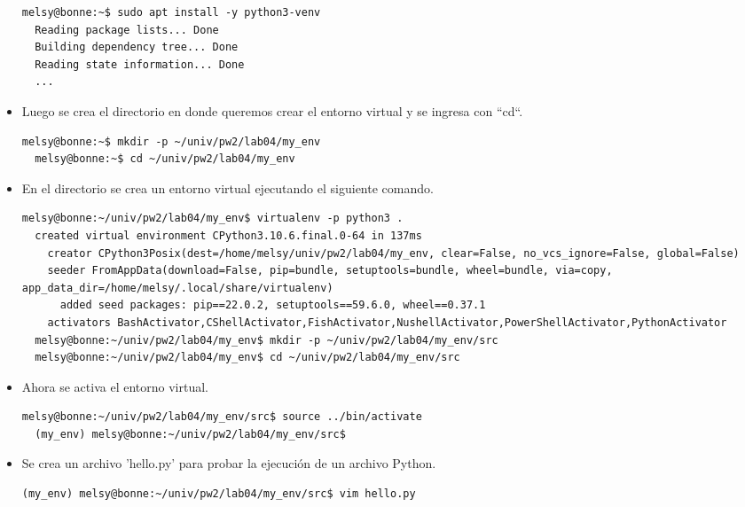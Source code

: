 \documentclass{article}
\begin{document}
\begin{itemize}
  \begin{lstlisting}[style=shell]
  melsy@bonne:~$ sudo apt install -y python3-venv
  Reading package lists... Done
  Building dependency tree... Done
  Reading state information... Done
  ...
  \end{lstlisting}
  
  \item Luego se crea el directorio en donde queremos crear el entorno virtual y se ingresa con ``cd``.

  \begin{lstlisting}[style=shell]
  melsy@bonne:~$ mkdir -p ~/univ/pw2/lab04/my_env
  melsy@bonne:~$ cd ~/univ/pw2/lab04/my_env
  \end{lstlisting}
  
  \item En el directorio se crea un entorno virtual ejecutando el siguiente comando.

  \begin{lstlisting}[style=shell]
  melsy@bonne:~/univ/pw2/lab04/my_env$ virtualenv -p python3 .
  created virtual environment CPython3.10.6.final.0-64 in 137ms
    creator CPython3Posix(dest=/home/melsy/univ/pw2/lab04/my_env, clear=False, no_vcs_ignore=False, global=False)
    seeder FromAppData(download=False, pip=bundle, setuptools=bundle, wheel=bundle, via=copy, app_data_dir=/home/melsy/.local/share/virtualenv)
      added seed packages: pip==22.0.2, setuptools==59.6.0, wheel==0.37.1
    activators BashActivator,CShellActivator,FishActivator,NushellActivator,PowerShellActivator,PythonActivator
  melsy@bonne:~/univ/pw2/lab04/my_env$ mkdir -p ~/univ/pw2/lab04/my_env/src
  melsy@bonne:~/univ/pw2/lab04/my_env$ cd ~/univ/pw2/lab04/my_env/src
  \end{lstlisting}
  
  \item Ahora se activa el entorno virtual.

  \begin{lstlisting}[style=shell]
  melsy@bonne:~/univ/pw2/lab04/my_env/src$ source ../bin/activate
  (my_env) melsy@bonne:~/univ/pw2/lab04/my_env/src$
  \end{lstlisting}
  
  \item Se crea un archivo 'hello.py' para probar la ejecución de un archivo Python.

  \begin{lstlisting}[style=shell]
  (my_env) melsy@bonne:~/univ/pw2/lab04/my_env/src$ vim hello.py
  \end{lstlisting}
  

\end{itemize}
\end{document}
